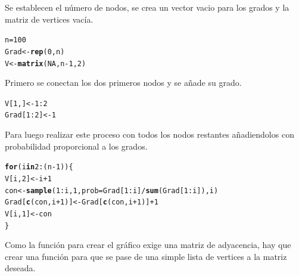 \documentclass{article}\usepackage[]{graphicx}\usepackage[]{color}
\makeatletter
\newcommand{\hlnum}[1]{\textcolor[rgb]{0.686,0.059,0.569}{#1}}%
\newcommand{\hlopt}[1]{\textcolor[rgb]{0,0,0}{#1}}%
\newcommand{\hlstd}[1]{\textcolor[rgb]{0.345,0.345,0.345}{#1}}%
\newcommand{\hlkwa}[1]{\textcolor[rgb]{0.161,0.373,0.58}{\textbf{#1}}}%
\newcommand{\hlkwb}[1]{\textcolor[rgb]{0.69,0.353,0.396}{#1}}%
\newcommand{\hlkwc}[1]{\textcolor[rgb]{0.333,0.667,0.333}{#1}}%
\newcommand{\hlkwd}[1]{\textcolor[rgb]{0.737,0.353,0.396}{\textbf{#1}}}%
\newenvironment{kframe}{%
 \def\at@end@of@kframe{}%
 \ifinner\ifhmode%
  \def\at@end@of@kframe{\end{minipage}}%
  \begin{minipage}{\columnwidth}%
 \fi\fi%
 \def\FrameCommand##1{\hskip\@totalleftmargin \hskip-\fboxsep
 \colorbox{shadecolor}{##1}\hskip-\fboxsep
     \hskip-\linewidth \hskip-\@totalleftmargin \hskip\columnwidth}%
 \MakeFramed {\advance\hsize-\width
   \@totalleftmargin\z@ \linewidth\hsize
   \@setminipage}}%
 {\par\unskip\endMakeFramed%
 \at@end@of@kframe}
\newenvironment{knitrout}{}{} %
\makeatother
\begin{document}
Se establecen el n\'umero de nodos, se crea un vector vacio para los grados y la matriz de vertices vac\'ia.
\begin{knitrout}
\color{fgcolor}\begin{kframe}
\begin{alltt}
\hlstd{n} \hlkwb{=} \hlnum{100}
\hlstd{Grad} \hlkwb{<-} \hlkwd{rep}\hlstd{(}\hlnum{0}\hlstd{, n)}
\hlstd{V} \hlkwb{<-} \hlkwd{matrix}\hlstd{(}\hlnum{NA}\hlstd{, n} \hlopt{-} \hlnum{1}\hlstd{,} \hlnum{2}\hlstd{)}
\end{alltt}
\end{kframe}
\end{knitrout}
Primero se conectan los dos primeros nodos y se a\~nade su grado.
\begin{knitrout}
\color{fgcolor}\begin{kframe}
\begin{alltt}
\hlstd{V[}\hlnum{1}\hlstd{, ]} \hlkwb{<-} \hlnum{1}\hlopt{:}\hlnum{2}
\hlstd{Grad[}\hlnum{1}\hlopt{:}\hlnum{2}\hlstd{]} \hlkwb{<-} \hlnum{1}
\end{alltt}
\end{kframe}
\end{knitrout}
Para luego realizar este proceso con todos los nodos restantes a\~nadiendolos con probabilidad proporcional a los grados.
\begin{knitrout}
\color{fgcolor}\begin{kframe}
\begin{alltt}
\hlkwa{for} \hlstd{(i} \hlkwa{in} \hlnum{2}\hlopt{:}\hlstd{(n} \hlopt{-} \hlnum{1}\hlstd{))\{}
  \hlstd{V[i,} \hlnum{2}\hlstd{]} \hlkwb{<-} \hlstd{i} \hlopt{+} \hlnum{1}
  \hlstd{con} \hlkwb{<-} \hlkwd{sample}\hlstd{(}\hlnum{1}\hlopt{:}\hlstd{i,} \hlnum{1}\hlstd{,} \hlkwc{prob} \hlstd{= Grad[}\hlnum{1}\hlopt{:}\hlstd{i]}\hlopt{/}\hlkwd{sum}\hlstd{(Grad[}\hlnum{1}\hlopt{:}\hlstd{i]),i)}
  \hlstd{Grad[}\hlkwd{c}\hlstd{(con,i}\hlopt{+}\hlnum{1}\hlstd{)]} \hlkwb{<-} \hlstd{Grad[}\hlkwd{c}\hlstd{(con,i}\hlopt{+}\hlnum{1}\hlstd{)]} \hlopt{+} \hlnum{1}
  \hlstd{V[i,} \hlnum{1}\hlstd{]} \hlkwb{<-} \hlstd{con}
\hlstd{\}}
\end{alltt}
\end{kframe}
\end{knitrout}
\clearpage
Como la funci\'on para crear el gr\'afico exige una matriz de adyacencia, hay que crear una funci\'on para que se pase de una simple lista de vertices a la matriz deseada.
\end{document}
